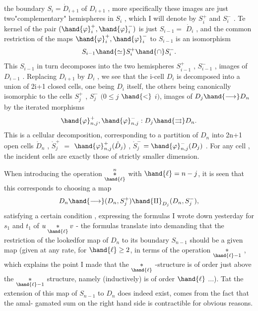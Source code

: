 
the boundary  $S_i = \dot{D}_{i+1}$ of $D_{i+1}$ , more specifically these images are
just two"complementary" hemispheres in $S_i$ , which I will denote by
$S_i^+$ and $S_i^-$ . Te kernel of the pair $(\hand{\varphi}_i^+ , \hand{\varphi}_i^-)$ is just $S_{i-1} =$ $\dot{D}_i$ ,
and the common restriction of the maps $\hand{\varphi}_i^+ , \hand{\varphi}_i^-$ to $S_{i-1}$ is an isomorphism
\[ S_{i-1} \hand{\simeq} S_i^+ \hand{\cap} S_i^- . \]
This $S_{i-1}$ in turn decomposes into the two hemispheres $S_{i-1}^+$ , $S_{i-1}^-$ ,
images of $D_{i-1}$ . Replacing $D_{i+1}$ by $D_i$ , we see that the i-cell $D_i$
is decomposed into a union of 2i+1 closed cells, one being $D_i$ itself,
the others being canonically isomorphic to the cells $S_j^+$ , $S_j^-$ $(0 \leq j$ $\hand{<}$ $i)$,
images of $D_j \hand{\longrightarrow} D_n$ by the iterated morphisms
\[ \hand{\varphi}_{n,j}^+ , \hand{\varphi}_{n,j}^- : D_j \hand{\rightrightarrows} D_n . \]
This is a cellular decomposition, corresponding to a partition of $D_n$
into 2n+1 open cells $\mathring{D}_n$ , $\mathring{S}_j^+$ $=$  $\hand{\varphi}_{n,j}^+(\mathring{D}_j)$ , $\mathring{S}_j^-$ $= \hand{\varphi}_{n,j}^-(D_j)$ . For
any cell , the incident cells are exactly those of strictly smaller
dimension.

When introducing the operation $\overset{n}{\underset{\hand{\ell}}{*}}$ with $\hand{\ell} = n-j$, it is seen that
this corresponds to choosing a map
\[ D_n \hand{\longrightarrow} (D_n , S_j^+) \hand{\amalg}_{D_j} (D_n , S_j^-) , \]
satisfying a certain condition \deleted{\unsure{$*$}}, expressing the formulas I wrote down
yesterday for $s_1$ and $t_1$ of $u \underset{\hand{\ell}}{*} v$ - the  formulas translate
into demanding that the restriction of the looked\hand{-}for map of $D_n$ to its
boundary $S_{n-1}$ should be a given map (given at any rate, for $\hand{\ell} \geq 2$, in
terms of the operation $\underset{\hand{\ell}-1}{*}$ , which explains the point I
made that the $\underset{\hand{\ell}}{*}$ -structure is of order just above the $\underset{\hand{\ell}-1}{*}$ structure,
namely (inductively) is of order $\hand{\ell}$ ...). Tat the extension of this
map of $S_{n-1}$ to $D_n$ does indeed exist, comes from the fact that the amal-%
gamated sum on the right hand side is contractible for obvious reasons.

